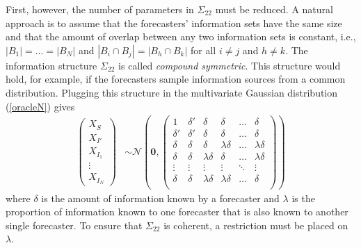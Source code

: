 \documentclass[11pt]{article}
\theoremstyle{definition}
\theoremstyle{definition}
\def\probit{p_{\rm probit}}
\begin{document}
First, however, the number of parameters in $\Sigma_{22}$ must be
reduced. A natural approach is to assume that the forecasters'
information sets have the same size and that the amount of overlap
between any two information sets is constant, i.e., $|B_{1}| = \dots =
|B_{N}|$ and $|B_{i} \cap B_{j}| = |B_{h} \cap B_{k}|$ for all $i \neq
j$ and $h \neq k$.
The information structure $\Sigma_{22}$ is called \textit{compound
symmetric}.  This structure would hold, for example, if the
forecasters sample information sources from a common distribution.
Plugging this structure in the multivariate Gaussian distribution
(\ref{oracleN}) gives
\begin{align*}
\left(\begin{matrix} X_{S} \\ X_{I'}\\ X_{I_1}\\ \vdots \\ X_{I_N} \end{matrix}\right) &\sim \mathcal{N}\left( 
 \boldsymbol{0}, 
 \left(\begin{array}{cc|cccc}
1 & \delta'& \delta & \delta & \dots & \delta  \\ 
\delta' & \delta' & \delta & \delta & \dots & \delta  \\ \hline
\delta & \delta &\delta & \lambda\delta & \dots & \lambda\delta   \\ 
\delta& \delta & \lambda\delta & \delta & \dots & \lambda\delta  \\ 
\vdots &\vdots & \vdots & \vdots & \ddots & \vdots  \\ 
\delta &\delta & \lambda\delta & \lambda\delta & \dots & \delta\\ 
 \end{array}\right)\right)
\end{align*}
where $\delta$ is the amount of information known by a forecaster and
$\lambda$ is the proportion of information known to one forecaster
that is also known to another single forecaster.  To ensure that
$\Sigma_{22}$ is coherent, a restriction must be placed on $\lambda$.
\end{document}
